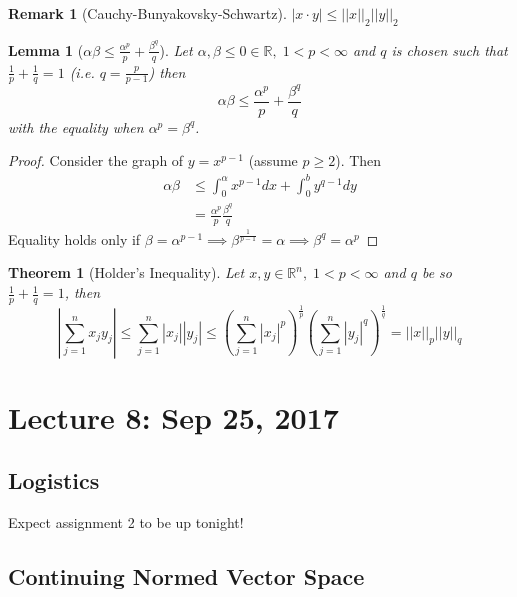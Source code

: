 \documentclass[11pt, oneside]{book}
\theoremstyle{break}
\newtheorem{thm}{Theorem}[section]
\newtheorem*{proof}{Proof}
\newtheorem{lemma}{Lemma}[section]
\newtheorem*{remark}{Remark}
\newcommand{\bb}[1]{\mathbb{#1}}			%
\begin{document}
\begin{remark}[Cauchy-Bunyakovsky-Schwartz]
	$|x \cdot y| \leq ||x||_2 ||y||_2$
\end{remark}

\begin{lemma}[$\alpha\beta \leq \frac{\alpha^p}{p} + \frac{\beta^q}{q}$]\label{lemma:alphabeta}
	Let $\alpha, \beta \leq 0 \in \bb{R}, \; 1 < p < \infty$ and $q$ is chosen such that $\frac{1}{p} + \frac{1}{q} = 1$ (i.e. $q = \frac{p}{p - 1}$) then
	\begin{equation}
		\alpha\beta \leq \frac{\alpha^p}{p} + \frac{\beta^q}{q}
	\end{equation}
	with the equality when $\alpha^p = \beta^q$.
\end{lemma}

\begin{proof}
	Consider the graph of $y = x^{p - 1}$ (assume $p \geq 2$). Then
	\begin{align*}
		\alpha\beta &\leq \int_{0}^{\alpha} x^{p - 1} dx + \int_{0}^{b} y^{q - 1} dy \\
								&= \frac{\alpha^p}{p} \frac{\beta^q}{q}
	\end{align*}
	Equality holds only if $\beta = \alpha^{p - 1} \implies \beta^{\frac{1}{p-1}} = \alpha \implies \beta^q = \alpha^p$
\end{proof}

\begin{thm}[Holder's Inequality]\label{thm:holder}
	Let $x, y \in \bb{R}^n, \; 1 < p < \infty$ and $q$ be so $\frac{1}{p} + \frac{1}{q} = 1$, then
	\begin{equation}
		\left| \sum_{j=1}^{n} x_j y_j \right| \leq \sum_{j=1}^{n} |x_j| |y_j| \leq \left( \sum_{j=1}^{n} |x_j|^p \right)^\frac{1}{p} \left(\sum_{j=1}^{n} |y_j|^q \right)^\frac{1}{q} = ||x||_p ||y||_q
	\end{equation}
\end{thm}

\chapter{Lecture 8: Sep 25, 2017}\label{chp:lec8}

\section{Logistics}
Expect assignment 2 to be up tonight!

\section{Continuing Normed Vector Space}\label{sect:normed_cont}
\end{document}
